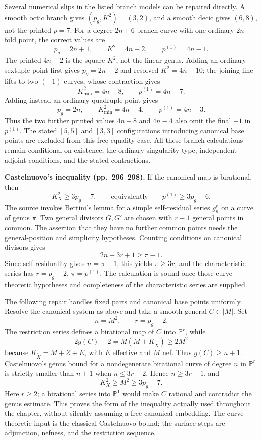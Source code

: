 Several numerical slips in the listed branch models can be repaired directly. A smooth octic branch gives \((p_g,K^2)=(3,2)\), and a smooth decic gives \((6,8)\), not the printed \(p=7\). For a degree-\(2n+6\) branch curve with one ordinary \(2n\)-fold point, the correct values are
\[
p_g=2n+1,\qquad K^2=4n-2,\qquad p^{(1)}=4n-1.
\]
The printed \(4n-2\) is the square \(K^2\), not the linear genus. Adding an ordinary sextuple point first gives \(p_g=2n-2\) and resolved \(K^2=4n-10\); the joining line lifts to two \((-1)\)-curves, whose contraction gives
\[
K_{\min}^2=4n-8,\qquad p^{(1)}=4n-7.
\]
Adding instead an ordinary quadruple point gives
\[
p_g=2n,\qquad K_{\min}^2=4n-4,\qquad p^{(1)}=4n-3.
\]
Thus the two further printed values \(4n-8\) and \(4n-4\) also omit the final \(+1\) in \(p^{(1)}\). The stated \([5,5]\) and \([3,3]\) configurations introducing canonical base points are excluded from this free equality case. All these branch calculations remain conditional on existence, the ordinary singularity type, independent adjoint conditions, and the stated contractions.

\textbf{Castelnuovo's inequality (pp.~296--298).}
If the canonical map is birational, then
\[
K_X^2\geq3p_g-7,
\qquad\text{equivalently}\qquad p^{(1)}\geq3p_g-6.
\]
The source invokes Bertini's lemma for a simple self-residual series \(g_n^r\) on a curve of genus \(\pi\). Two general divisors \(G,G'\) are chosen with \(r-1\) general points in common. The assertion that they have no further common points needs the general-position and simplicity hypotheses. Counting conditions on canonical divisors gives
\[
2n-3r+1\geq\pi-1.
\]
Since self-residuality gives \(n=\pi-1\), this yields \(\pi\geq3r\), and the characteristic series has \(r=p_g-2\), \(\pi=p^{(1)}\). The calculation is sound once those curve-theoretic hypotheses and completeness of the characteristic series are supplied.

The following repair handles fixed parts and canonical base points uniformly. Resolve the canonical system as above and take a smooth general \(C\in|M|\). Set
\[
n=M^2,\qquad r=p_g-2.
\]
The restriction series defines a birational map of \(C\) into \(\mathbb P^r\), while
\[
2g(C)-2=M(M+K_{\widetilde X})\geq2M^2
\]
because \(K_{\widetilde X}=M+Z+E\), with \(E\) effective and \(M\) nef. Thus \(g(C)\geq n+1\). Castelnuovo's genus bound for a nondegenerate birational curve of degree \(n\) in \(\mathbb P^r\) is strictly smaller than \(n+1\) when \(n\leq3r-2\). Hence \(n\geq3r-1\), and
\[
K_X^2\geq M^2\geq3p_g-7.
\]
Here \(r\geq2\); a birational series into \(\mathbb P^1\) would make \(C\) rational and contradict the genus estimate. This proves the form of the inequality actually used throughout the chapter, without silently assuming a free canonical embedding. The curve-theoretic input is the classical Castelnuovo bound; the surface steps are adjunction, nefness, and the restriction sequence.

